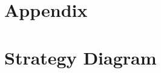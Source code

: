 \documentclass[acmtog, authorversion, tikz, border=10pt]{acmart}
\begin{document}

\maketitle

















\pagebreak




\onecolumn
\begin{appendix}
\section*{Appendix}
\section{Strategy Diagram}
\label{sec:strat_diag}

\end{appendix}
\end{document}
